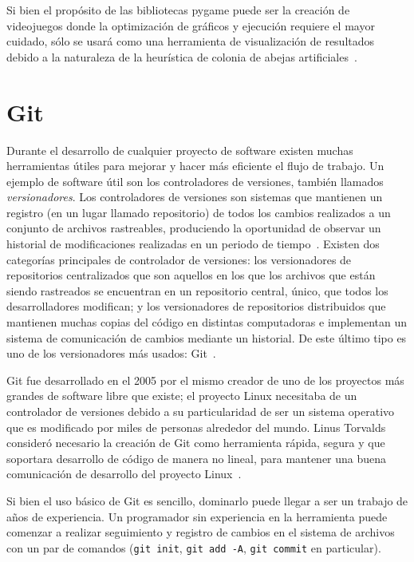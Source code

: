 Si bien el propósito de las bibliotecas pygame puede ser la creación de 
videojuegos donde la optimización de gráficos y ejecución requiere el mayor 
cuidado, sólo se usará como una herramienta de visualización de resultados debido 
a la naturaleza de la heurística de colonia de abejas artificiales~\cite{pygame}.



\section{Git}

Durante el desarrollo de cualquier proyecto de software existen muchas herramientas útiles para
mejorar y hacer más eficiente el flujo de trabajo. Un ejemplo de software útil son
los controladores de versiones, también llamados \textit{versionadores}.
Los controladores de versiones son sistemas que
mantienen un registro (en un lugar llamado repositorio) de todos los cambios
realizados a un conjunto de archivos rastreables, produciendo la oportunidad de
observar un historial de modificaciones realizadas en un periodo de
tiempo~\cite{git-about}. Existen dos categorías principales de controlador de
versiones: los versionadores de repositorios centralizados que son aquellos en los que los
archivos que están siendo rastreados se encuentran en un repositorio central,
único, que todos los desarrolladores modifican; y los versionadores de repositorios
distribuidos que mantienen muchas copias del código en distintas computadoras e
implementan un sistema de comunicación de cambios mediante un historial. De este
último tipo es uno de los versionadores más usados: Git~\cite{scopatz2015effective}.

Git fue desarrollado en el 2005 por el mismo creador de uno de los proyectos más
grandes de software libre que existe; el proyecto Linux necesitaba de un controlador de
versiones debido a su particularidad de ser un sistema operativo que es
modificado por miles de personas alrededor del mundo. Linus Torvalds
consideró necesario la creación de Git como herramienta rápida, segura y que
soportara desarrollo de código de manera no lineal, para mantener una buena
comunicación de desarrollo del proyecto Linux~\cite{git-about2,git-commit}.

Si bien el uso básico de Git es sencillo, dominarlo puede llegar a ser un
trabajo de años de experiencia. Un programador sin experiencia en la herramienta
puede comenzar a realizar seguimiento y registro de cambios en el sistema de
archivos con un par de comandos (\texttt{git init}, \texttt{git add -A},
\texttt{git commit} en particular).

